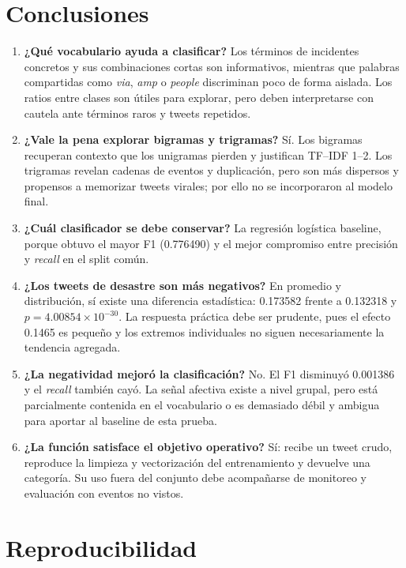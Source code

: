 \documentclass[11pt,letterpaper]{article}
\begin{document}
\section{Conclusiones}

\begin{enumerate}
  \item \textbf{¿Qué vocabulario ayuda a clasificar?} Los términos de incidentes concretos y sus combinaciones cortas son informativos, mientras que palabras compartidas como \emph{via}, \emph{amp} o \emph{people} discriminan poco de forma aislada. Los ratios entre clases son útiles para explorar, pero deben interpretarse con cautela ante términos raros y tweets repetidos.
  \item \textbf{¿Vale la pena explorar bigramas y trigramas?} Sí. Los bigramas recuperan contexto que los unigramas pierden y justifican TF--IDF 1--2. Los trigramas revelan cadenas de eventos y duplicación, pero son más dispersos y propensos a memorizar tweets virales; por ello no se incorporaron al modelo final.
  \item \textbf{¿Cuál clasificador se debe conservar?} La regresión logística baseline, porque obtuvo el mayor F1 (0.776490) y el mejor compromiso entre precisión y \emph{recall} en el split común.
  \item \textbf{¿Los tweets de desastre son más negativos?} En promedio y distribución, sí existe una diferencia estadística: 0.173582 frente a 0.132318 y $p=4.00854\times10^{-30}$. La respuesta práctica debe ser prudente, pues el efecto 0.1465 es pequeño y los extremos individuales no siguen necesariamente la tendencia agregada.
  \item \textbf{¿La negatividad mejoró la clasificación?} No. El F1 disminuyó 0.001386 y el \emph{recall} también cayó. La señal afectiva existe a nivel grupal, pero está parcialmente contenida en el vocabulario o es demasiado débil y ambigua para aportar al baseline de esta prueba.
  \item \textbf{¿La función satisface el objetivo operativo?} Sí: recibe un tweet crudo, reproduce la limpieza y vectorización del entrenamiento y devuelve una categoría. Su uso fuera del conjunto debe acompañarse de monitoreo y evaluación con eventos no vistos.
\end{enumerate}

\clearpage
\appendix
\section{Reproducibilidad}
\end{document}

